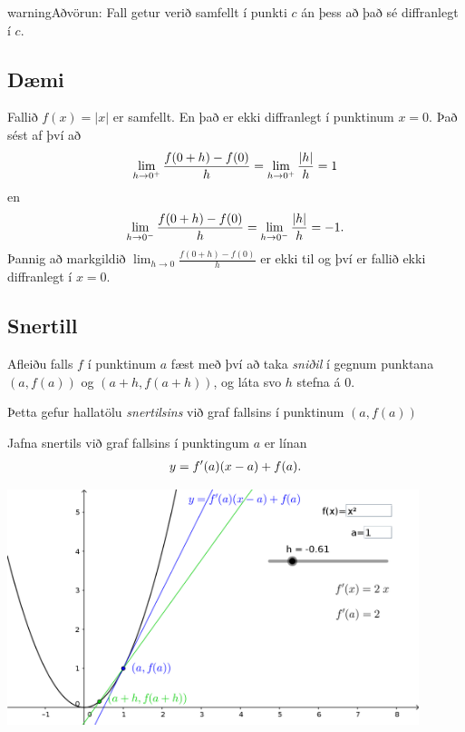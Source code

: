 \documentclass[b5paper,10pt,icelandic]{sphinxmanual}
\begin{document}
\begin{notice}{warning}{Aðvörun:}
Fall getur verið samfellt í punkti \(c\) án þess að það sé
diffranlegt í \(c\).
\end{notice}


\subsection{Dæmi}
\label{kafli03:id1}
Fallið \(f(x) = |x|\) er samfellt. En það er ekki diffranlegt í
punktinum \(x=0\). Það sést af því að
\begin{gather}
\begin{split}\lim_{h\to 0^+} \frac{f(0+h)-f(0)}{h} = \lim_{h\to 0^+} \frac{|h|}{h} = 1\end{split}\notag
\end{gather}
en
\begin{gather}
\begin{split}\lim_{h\to 0^-} \frac{f(0+h)-f(0)}{h} = \lim_{h\to 0^-} \frac{|h|}{h} = -1.\end{split}\notag
\end{gather}
Þannig að markgildið \(\lim_{h\to 0} \frac{f(0+h)-f(0)}{h}\) er ekki til og því er
fallið ekki diffranlegt í \(x=0\).


\subsection{Snertill}
\label{kafli03:snertill}\label{kafli03:index-1}
Afleiðu falls \(f\) í punktinum \(a\) fæst með því að taka
\textit{sniðil} í gegnum punktana \((a,f(a))\) og \((a+h,f(a+h))\), og
láta svo \(h\) stefna á \(0\).

Þetta gefur hallatölu \textit{snertilsins} við graf fallsins í punktinum
\((a,f(a))\)

Jafna snertils við graf fallsins í punktingum \(a\) er línan
\begin{gather}
\begin{split}y = f'(a)(x-a) + f(a).\end{split}\notag
\end{gather}

\begin{center}
\includegraphics[width=12cm,keepaspectratio=true]{./01_05_snertill.png}
\end{center}
\end{document}
